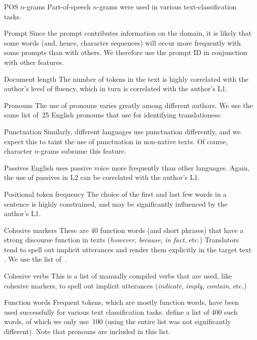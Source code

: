 \documentclass[11pt,letterpaper]{article}
\newcommand{\textnl}{\textsl}
\begin{document}
\begin{compactdesc}
\item[POS $n$-grams] Part-of-speech $n$-grams were used in various
  text-classification tasks.
\item[Prompt] Since the prompt contributes information on the domain,
  it is likely that some words (and, hence, character sequences) will
  occur more frequently with some prompts than with others. We
  therefore use the prompt ID in conjunction with other features.
\item[Document length] The number of tokens in the text is highly
  correlated with the author's level of fluency, which in turn is
  correlated with the author's L1.
\item[Pronouns] The use of pronouns varies greatly among different
  authors. We use the same list of~25 English pronouns that
  \citet{vered:noam:shuly} use for identifying translationese.
\item[Punctuation] Similarly, different languages use punctuation
  differently, and we expect this to taint the use of punctuation in
  non-native texts. Of course, character $n$-grams subsume this feature.
\item[Passives] English uses passive voice more frequently than other
  languages. Again, the use of passives in L2 can be correlated with
  the author's L1.
\item[Positional token frequency] The choice of the first and last few
  words in a sentence is highly constrained, and may be significantly
  influenced by the author's L1.
\item[Cohesive markers] These are 40 function words (and short
  phrases) that have a strong discourse function in texts (\textnl{however},
  \textnl{because}, \textnl{in fact}, etc.) Translators tend to spell out implicit
  utterances and render them explicitly in the target text
  \citep{Blum-Kulka:1986}. We use the list
  of~\citet{vered:noam:shuly}.
\item[Cohesive verbs] This is a list of manually compiled verbs that
  are used, like cohesive markers, to spell out implicit utterances
  (\textnl{indicate}, \textnl{imply}, \textnl{contain}, etc.)
\item[Function words] Frequent tokens, which are mostly function
  words, have been used successfully for various text classification
  tasks. \citet{koppel-ordan:2011:ACL-HLT2011} define a list of 400
  such words, of which we only use~100 (using the entire list was not
  significantly different). Note that pronouns are included in this list.

\end{compactdesc}
\end{document}
